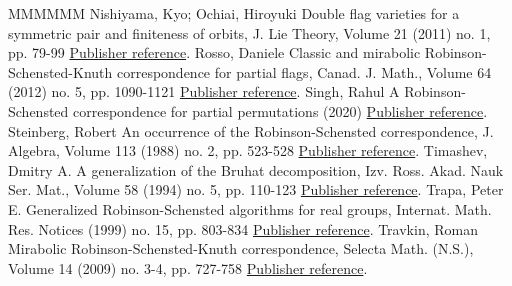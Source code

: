 \documentclass[11pt]{article}
\theoremstyle{definition}
\numberwithin{equation}{section}
\begin{document}
\begin{thebibliography}{MMMMMM}
 Nishiyama, Kyo; Ochiai, Hiroyuki Double flag varieties for a symmetric pair and finiteness of orbits, J. Lie Theory, Volume 21 (2011) no. 1, pp. 79-99 \href{https://alco.centre-mersenne.org/articles/10.5802/alco.245/#NO}{Publisher reference}.
 Rosso, Daniele Classic and mirabolic Robinson-Schensted-Knuth correspondence for partial flags, Canad. J. Math., Volume 64 (2012) no. 5, pp. 1090-1121 \href{https://alco.centre-mersenne.org/articles/10.5802/alco.245/#Rosso}{Publisher reference}.
 Singh, Rahul A Robinson-Schensted correspondence for partial permutations (2020) \href{https://alco.centre-mersenne.org/articles/10.5802/alco.245/#Singh}{Publisher reference}.
 Steinberg, Robert An occurrence of the Robinson-Schensted correspondence, J. Algebra, Volume 113 (1988) no. 2, pp. 523-528 \href{https://alco.centre-mersenne.org/articles/10.5802/alco.245/#Steinberg-occurrence}{Publisher reference}.
 Timashev, Dmitry A. A generalization of the Bruhat decomposition, Izv. Ross. Akad. Nauk Ser. Mat., Volume 58 (1994) no. 5, pp. 110-123 \href{https://alco.centre-mersenne.org/articles/10.5802/alco.245/#Timashev}{Publisher reference}.
 Trapa, Peter E. Generalized Robinson-Schensted algorithms for real groups, Internat. Math. Res. Notices (1999) no. 15, pp. 803-834 \href{https://alco.centre-mersenne.org/articles/10.5802/alco.245/#Trapa-IMRN}{Publisher reference}.
 Travkin, Roman Mirabolic Robinson-Schensted-Knuth correspondence, Selecta Math. (N.S.), Volume 14 (2009) no. 3-4, pp. 727-758 \href{https://alco.centre-mersenne.org/articles/10.5802/alco.245/#Travkin}{Publisher reference}.
\end{thebibliography}
\end{document}

